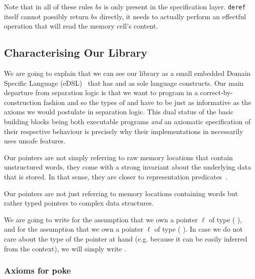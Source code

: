 Note that in all of these rules $\mathit{bs}$ is only present
in the specification layer. \texttt{deref} itself cannot possibly
return $\mathit{bs}$ directly, it needs to actually perform an
effectful operation that will read the memory cell's content.

\subsection{Characterising Our Library}

We are going to explain that we can see our library as a small
embedded Domain Specific
Language (eDSL)~\citep{DBLP:journals/csur/Hudak96}
that has  and  as
sole language constructs.
%
Our main departure from separation logic is that we want to
program in a correct-by-construction fashion and so the types
of  and  have to be
just as informative as the axioms we would postulate
in separation logic.
%
This dual status of the basic building blocks being both
executable programs \emph{and} an axiomatic specification
of their respective behaviour is precisely why their
implementations in \idris{} necessarily uses unsafe features.

Our pointers are not simply referring to raw memory locations
that contain unstructured words, they come with a strong invariant
about the underlying data that is stored.
In that sense, they are closer to representation
predicates~\citep{MANUAL:book/sfoundations/Chargueraud23}.

Our pointers are not just referring to memory locations containing
words but rather typed
pointers to complex data structures.

We are going to write  for the assumption
that we own a pointer $\ell$ of type
(   ),
and  for the assumption that we own
a pointer $\ell$ of type (  ).
%
In case we do not care about the type of the pointer at hand
(e.g. because it can be easily inferred from the context), we
will simply write .


\subsubsection{Axioms for poke}\label{sec:axiom-poke}

